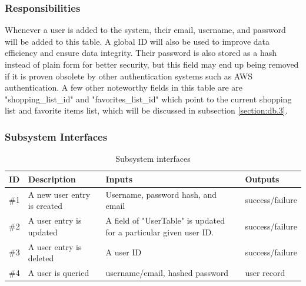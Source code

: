 \subsubsection{Responsibilities}
Whenever a user is added to the system, their email, username, and password will be added to this table.  A global ID will also be used to improve data efficiency and ensure data integrity.  Their password is also stored as a hash instead of plain form for better security, but this field may end up being removed if it is proven obsolete by other authentication systems such as AWS authentication.  A few other noteworthy fields in this table are are "shopping\_list\_id" and "favorites\_list\_id" which point to the current shopping list and favorite items list, which will be discussed in subsection \ref{section:db.3}.


\subsubsection{Subsystem Interfaces}
\begin {table}[H]
\caption {Subsystem interfaces} 
\begin{center}
    \begin{tabular}{ | p{1cm} | p{6cm} | p{3cm} | p{3cm} |}
    \hline
    ID & Description & Inputs & Outputs \\ \hline
    \#1 & A new user entry is created & Username, password hash, and email & success/failure  \\ \hline
    \#2 & A user entry is updated & A field of "UserTable" is updated for a particular given user ID. & success/failure  \\ \hline
    \#3 & A user entry is deleted & A user ID & success/failure  \\ \hline
    \#4 & A user is queried & username/email, hashed password & user record  \\ \hline
    \end{tabular}
\end{center}
\end{table}


